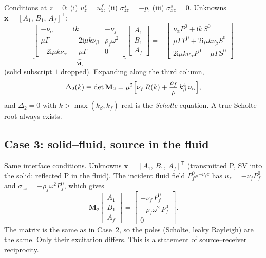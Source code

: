 \documentclass[11pt,a4paper]{article}
\newcommand{\ii}{\mathrm{i}}
\begin{document}
Conditions at $z=0$: (i) $u_z^{s}=u_z^{f}$, (ii) $\sigma_{zz}^{s}=-p$, (iii) $\sigma_{xz}^{s}=0$.
Unknowns $\mathbf x=[A_1,\,B_1,\,A_f]^{\mathsf T}$:
\begin{equation}
\underbrace{\begin{bmatrix}
 -\nu_{\alpha} & \ii k & -\nu_f\\[2pt]
 \mu\Gamma & -2\ii\mu k\nu_{\beta} & \rho_f\omega^2\\[2pt]
 -2\ii\mu k\nu_{\alpha} & -\mu\Gamma & 0
\end{bmatrix}}_{\mathbf M_2}
\begin{bmatrix}A_1\\ B_1\\ A_f\end{bmatrix}
=
-\begin{bmatrix}
 \nu_{\alpha}P^0+\ii k\,S^0\\
 \mu\Gamma P^0+2\ii\mu k\nu_{\beta}S^0\\
 2\ii\mu k\nu_{\alpha}P^0-\mu\Gamma S^0
\end{bmatrix}
\label{eq:case2}
\end{equation}
(solid subscript $1$ dropped). Expanding along the third column,
\begin{equation}
  \Delta_2(k)\equiv\det\mathbf M_2
  =\mu^2\Bigl[\nu_f\,R(k)+\frac{\rho_f}{\rho}\,k_\beta^4\,\nu_\alpha\Bigr],
  \label{eq:scholte}
\end{equation}
and $\Delta_2=0$ with $k>\max(k_\beta,k_f)$ real is the \emph{Scholte} equation. A true Scholte root
always exists.

\subsection{Case 3: solid--fluid, source in the fluid}

Same interface conditions. Unknowns $\mathbf x=[A_1,\,B_1,\,A_f]^{\mathsf T}$ (transmitted P, SV into the
solid; reflected P in the fluid). The incident fluid field $P_f^0e^{-\nu_fz}$ has
$u_z=-\nu_fP_f^0$ and $\sigma_{zz}=-\rho_f\omega^2P_f^0$, which gives
\begin{equation}
\mathbf M_2
\begin{bmatrix}A_1\\ B_1\\ A_f\end{bmatrix}
=
\begin{bmatrix}
 -\nu_f\,P_f^0\\
 -\rho_f\omega^2\,P_f^0\\
 0
\end{bmatrix}.
\label{eq:case3}
\end{equation}
The matrix is the same as in Case~2, so the poles (Scholte, leaky Rayleigh) are the same.
Only their excitation differs. This is a statement of source--receiver reciprocity.
\end{document}
